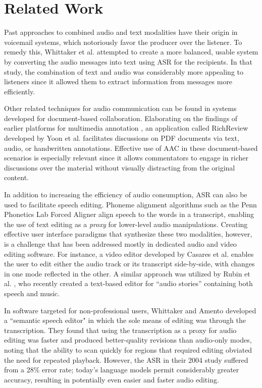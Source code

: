 \section{Related Work}
Past approaches to combined audio and text modalities have their origin in voicemail systems, which notoriously favor the producer over the listener. 
To remedy this, Whittaker et al. \cite{whittaker} attempted to create a more balanced, usable system by converting the audio messages into text using ASR for the recipients. 
In that study, the combination of text and audio was considerably more appealing to listeners since it allowed them to extract information from messages more efficiently. 

Other related techniques for audio communication can be found in systems developed for document-based collaboration. 
Elaborating on the findings of earlier platforms for multimedia annotation \cite{bargeron}, an application called RichReview developed by Yoon et al. \cite{yoon} facilitates discussions on PDF documents via text, audio, or handwritten annotations. 
Effective use of AAC in these document-based scenarios is especially relevant since it allows commentators to engage in richer discussions over the material without visually distracting from the original content. 

In addition to increasing the efficiency of audio consumption, ASR can also be used to facilitate speech editing. 
Phoneme alignment algorithms such as the Penn Phonetics Lab Forced Aligner \cite{p2fa} align speech to the words in a transcript, enabling the use of text editing as a \emph{proxy} for lower-level audio manipulations.
Creating effective user interface paradigms that synthesize these two modalities, however, is a challenge that has been addressed mostly in dedicated audio and video editing software. 
For instance, a video editor developed by Casares et al. \cite{casares} enables the user to edit either the audio track or its transcript side-by-side, with changes in one mode reflected in the other. 
A similar approach was utilized by Rubin et al. \cite{rubin}, who recently created a text-based editor for ``audio stories'' containing both speech and music.

In software targeted for non-professional users, Whittaker and Amento \cite{whittaker_semantic} developed a ``semantic speech editor" in which the sole means of editing was through the transcription. 
They found that using the transcription as a proxy for audio editing was faster and produced better-quality revisions than audio-only modes, noting that the ability to scan quickly for regions that required editing obviated the need for repeated playback. 
However, the ASR in their 2004 study suffered from a 28\% error rate; today's language models permit considerably greater accuracy, resulting in potentially even easier and faster audio editing.